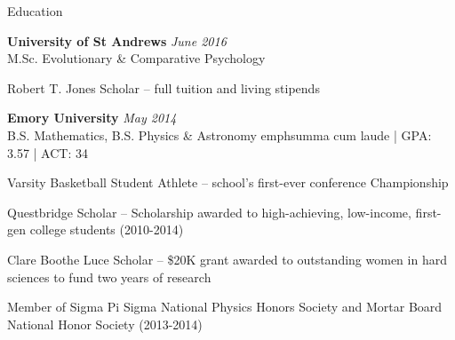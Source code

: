 \documentclass{resume} %
\begin{document}

\begin{rSection}{Education}

{\bf University of St Andrews} \hfill {\em June 2016} \\
M.Sc. Evolutionary \& Comparative Psychology \\
\item Robert T. Jones Scholar – full tuition and living stipends



{\bf Emory University} \hfill {\em May 2014} \\
B.S. Mathematics, B.S. Physics \& Astronomy emph{summa cum laude} | GPA: 3.57 | ACT: 34 \\
\item Varsity Basketball Student Athlete – school's first-ever conference Championship
\item Questbridge Scholar – Scholarship awarded to high-achieving, low-income, first-gen college students (2010-2014)
\item Clare Boothe Luce Scholar – \$20K grant awarded to outstanding women in hard sciences to fund two years of research
\item Member of Sigma Pi Sigma National Physics Honors Society and Mortar Board National Honor Society (2013-2014)

\end{rSection}




\end{document}
